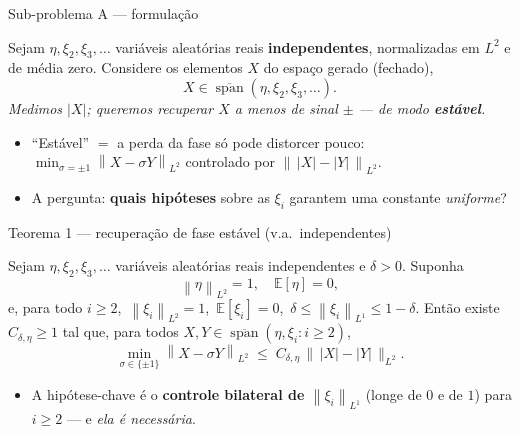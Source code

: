 \documentclass[10pt,aspectratio=169]{beamer}
\newcommand{\E}{\mathbb{E}}
\DeclareMathOperator{\Span}{span}
\newcommand{\abs}[1]{\left|#1\right|}
\newcommand{\norm}[1]{\left\|#1\right\|}
\newcommand{\hl}[1]{{\color{accent}\textbf{#1}}}
\newcommand{\hlb}[1]{{\color{accent2}\textbf{#1}}}
\newcommand{\hlo}[1]{{\color{accent3}\textbf{#1}}}
\begin{document}
\begin{frame}{Sub-problema A --- formulação}
  \begin{defbox}[Setup]
    Sejam $\eta,\xi_2,\xi_3,\ldots$ variáveis aleatórias reais
    \hlb{independentes}, normalizadas em $L^2$ e de média zero.
    Considere os elementos $X$ do espaço gerado (fechado),
    \[
      X \in \overline{\Span}(\eta,\xi_2,\xi_3,\ldots).
    \]
    \emph{Medimos $\abs{X}$; queremos recuperar $X$ a menos de sinal
    $\pm$ --- de modo \hlo{estável}.}
  \end{defbox}
  \vspace{0.4em}
  \pause
  \begin{itemize}\small
    \setlength{\itemsep}{0.35em}
    \item ``Estável'' $=$ a perda da fase só pode distorcer pouco:
          $\min_{\sigma=\pm1}\norm{X-\sigma Y}_{L^2}$ controlado por
          $\norm{\,\abs{X}-\abs{Y}\,}_{L^2}$.
    \item A pergunta: \hl{quais hipóteses} sobre as $\xi_i$ garantem
          uma constante \emph{uniforme}?
  \end{itemize}
\end{frame}

\begin{frame}{Teorema 1 --- recuperação de fase estável (v.a.\ independentes)}
  \begin{thmbox}
    \small
    Sejam $\eta,\xi_2,\xi_3,\ldots$ variáveis aleatórias reais
    independentes e $\delta>0$. Suponha
    \[
      \norm{\eta}_{L^2}=1,\quad \E[\eta]=0,
    \]
    e, para todo $i\ge2$,\
    $\norm{\xi_i}_{L^2}=1$,\ $\E[\xi_i]=0$,\
    $\delta\le\norm{\xi_i}_{L^1}\le 1-\delta$.
    Então existe $C_{\delta,\eta}\ge1$ tal que, para todos
    $X,Y\in\overline{\Span}(\eta,\xi_i:i\ge2)$,
    \[
      \min_{\sigma\in\{\pm1\}}\norm{X-\sigma Y}_{L^2}
      \;\le\;
      C_{\delta,\eta}\,\bigl\|\,\abs{X}-\abs{Y}\,\bigr\|_{L^2}.
    \]
  \end{thmbox}
  \vspace{0.5em}
  \pause
  \begin{itemize}\small
    \item A hipótese-chave é o \hl{controle bilateral de
          $\norm{\xi_i}_{L^1}$} (longe de $0$ e de $1$) para
          $i\ge2$ --- e \emph{ela é necessária}.
  \end{itemize}
\end{frame}
\end{document}
